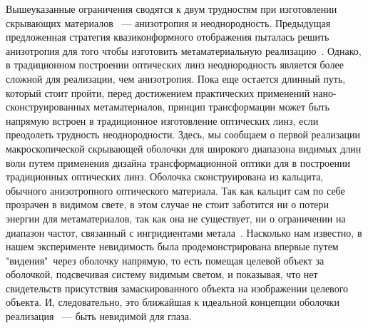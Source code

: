 \documentclass[a4paper, 12pt]{article}
\begin{document}
Вышеуказанные ограничения сводятся к двум трудностям при изготовлении
скрывающих материалов ~--- анизотропия и неоднородность. Предыдущая 
предложенная стратегия квазиконформного отображения пыталась решить
анизотропия для того чтобы изготовить метаматериальную 
реализацию~\cite{li_carpet}.
Однако, в традиционном построении оптических линз неоднородность
является более сложной для реализации, чем анизотропия. Пока еще остается
длинный путь, который стоит пройти, перед достижением практических 
применений нано-сконструированных метаматериалов, принцип трансформации
может быть напрямую встроен в традиционное изготовление оптических линз,
если преодолеть трудность неоднородности. Здесь, мы сообщаем о первой 
реализации макроскопической скрывающей оболочки для широкого диапазона
видимых длин волн путем применения дизайна трансформационной оптики для
в построении традиционных оптических линз. Оболочка сконструирована из
кальцита, обычного анизотропного оптического материала. Так как кальцит
сам по себе прозрачен в видимом свете, в этом случае не стоит заботится ни
о потери энергии для метаматериалов, так как она не существует, ни о 
ограничении на диапазон частот, связанный с ингридиентами 
метала~\cite{huanyang_review}.
Насколько нам известно, в нашем эксперименте невидимость была 
продемонстрирована впервые путем "видения"\ через оболочку напрямую,
то есть помещая целевой объект за оболочкой, подсвечивая систему видимым
светом, и показывая, что нет свидетельств присутствия замаскированного
объекта на изображении целевого объекта. И, следовательно, это ближайшая
к идеальной концепции оболочки реализация ~--- быть невидимой для глаза.
\end{document}
